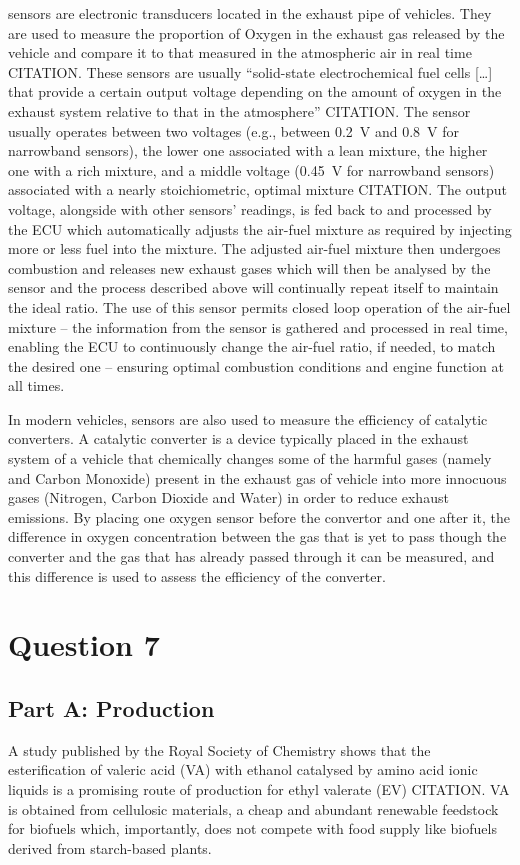 \documentclass[11pt]{article}
\begin{document}
 sensors are electronic transducers located in the exhaust pipe of vehicles. They are used to measure the proportion of Oxygen in the exhaust gas released by the vehicle and compare it to that measured in the atmospheric air in real time CITATION. These sensors are usually “solid-state electrochemical fuel cells […] that provide a certain output voltage depending on the amount of oxygen in the exhaust system relative to that in the atmosphere” CITATION. The sensor usually operates between two voltages (e.g., between \SI{0.2}{\volt} and \SI{0.8}{\volt} for narrowband sensors), the lower one associated with a lean mixture, the higher one with a rich mixture, and a middle voltage (\SI{0.45}{\volt} for narrowband sensors) associated with a nearly stoichiometric, optimal mixture CITATION. The output voltage, alongside with other sensors’ readings, is fed back to and processed by the ECU which automatically adjusts the air-fuel mixture as required by injecting more or less fuel into the mixture. The adjusted air-fuel mixture then undergoes combustion and releases new exhaust gases which will then be analysed by the  sensor and the process described above will continually repeat itself to maintain the ideal ratio. The use of this sensor permits closed loop operation of the air-fuel mixture – the information from the sensor is gathered and processed in real time, enabling the ECU to continuously change the air-fuel ratio, if needed, to match the desired one – ensuring optimal combustion conditions and engine function at all times.

In modern vehicles,  sensors are also used to measure the efficiency of catalytic converters. A catalytic converter is a device typically placed in the exhaust system of a vehicle that chemically changes some of the harmful gases (namely  and Carbon Monoxide) present in the exhaust gas of vehicle into more innocuous gases (Nitrogen, Carbon Dioxide and Water) in order to reduce exhaust emissions. By placing one oxygen sensor before the convertor and one after it, the difference in oxygen concentration between the gas that is yet to pass though the converter and the gas that has already passed through it can be measured, and this difference is used to assess the efficiency of the converter.
\section{Question 7}
\subsection*{Part A: Production}
A study published by the Royal Society of Chemistry shows that the esterification of valeric acid (VA) with ethanol catalysed by amino acid ionic liquids is a promising route of production for ethyl valerate (EV) CITATION. VA is obtained from cellulosic materials, a cheap and abundant renewable feedstock for biofuels which, importantly, does not compete with food supply like biofuels derived from starch-based plants.
\end{document}
